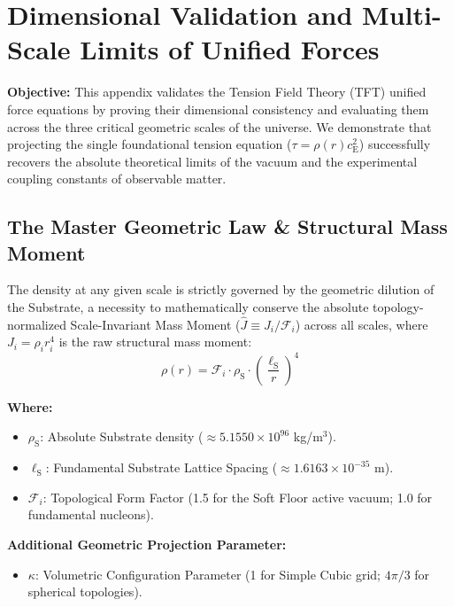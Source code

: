 \chapter{Dimensional Validation and Multi-Scale Limits of Unified Forces}
\label{app:unifiedforces_validation}

\noindent\textbf{Objective:} This appendix validates the Tension Field Theory (TFT) unified force equations by proving their dimensional consistency and evaluating them across the three critical geometric scales of the universe. We demonstrate that projecting the single foundational tension equation ($\tau = \rho(r)c_{\mathrm{E}}^2$) successfully recovers the absolute theoretical limits of the vacuum and the experimental coupling constants of observable matter.

\section{The Master Geometric Law \& Structural Mass Moment}
The density at any given scale is strictly governed by the geometric dilution of the Substrate, a necessity to mathematically conserve the absolute topology-normalized Scale-Invariant Mass Moment ($\hat{J} \equiv J_i / \mathcal{F}_i$) across all scales, where $J_i = \rho_i r_i^4$ is the raw structural mass moment:
\begin{equation}
    \rho(r) = \mathcal{F}_i \cdot \rho_{\mathrm{S}} \cdot \left(\frac{\ell_{\mathrm{S}}}{r}\right)^4
\end{equation}

\noindent\textbf{Where:}
\begin{itemize}
    \item $\rho_{\mathrm{S}}$: Absolute Substrate density ($\approx 5.1550 \times 10^{96}$ kg/m$^3$).
    \item $\ell_{\mathrm{S}}$: Fundamental Substrate Lattice Spacing ($\approx 1.6163 \times 10^{-35}$ m).
    \item $\mathcal{F}_i$: Topological Form Factor (1.5 for the Soft Floor active vacuum; 1.0 for fundamental nucleons).
\end{itemize}

\noindent\textbf{Additional Geometric Projection Parameter:}
\begin{itemize}
    \item $\kappa$: Volumetric Configuration Parameter (1 for Simple Cubic grid; $4\pi/3$ for spherical topologies).
\end{itemize}


